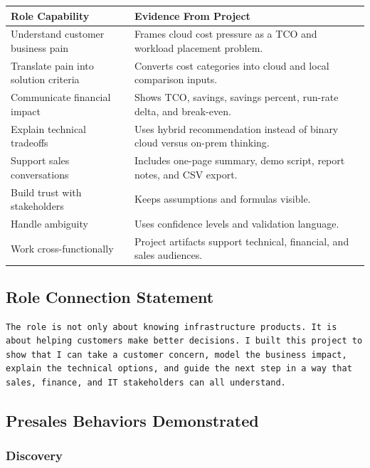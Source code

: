 \documentclass[11pt,a4paper]{article}
\begin{document}
\begin{longtable}{p{}p{}}
\toprule
\textbf{Role Capability} & \textbf{Evidence From Project} \\
\midrule
Understand customer business pain & Frames cloud cost pressure as a TCO and workload placement problem. \\
Translate pain into solution criteria & Converts cost categories into cloud and local comparison inputs. \\
Communicate financial impact & Shows TCO, savings, savings percent, run-rate delta, and break-even. \\
Explain technical tradeoffs & Uses hybrid recommendation instead of binary cloud versus on-prem thinking. \\
Support sales conversations & Includes one-page summary, demo script, report notes, and CSV export. \\
Build trust with stakeholders & Keeps assumptions and formulas visible. \\
Handle ambiguity & Uses confidence levels and validation language. \\
Work cross-functionally & Project artifacts support technical, financial, and sales audiences. \\
\bottomrule
\end{longtable}

\subsection{Role Connection Statement}

\begin{lstlisting}
The role is not only about knowing infrastructure products. It is about helping customers make better decisions. I built this project to show that I can take a customer concern, model the business impact, explain the technical options, and guide the next step in a way that sales, finance, and IT stakeholders can all understand.
\end{lstlisting}

\subsection{Presales Behaviors Demonstrated}

\subsubsection{Discovery}
\end{document}
